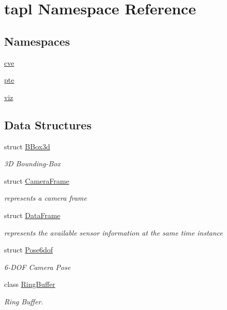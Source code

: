 \hypertarget{namespacetapl}{}\section{tapl Namespace Reference}
\label{namespacetapl}
\subsection*{Namespaces}
\begin{DoxyCompactItemize}
\item 
 \hyperlink{namespacetapl_1_1cve}{cve}
\item 
 \hyperlink{namespacetapl_1_1pte}{pte}
\item 
 \hyperlink{namespacetapl_1_1viz}{viz}
\end{DoxyCompactItemize}
\subsection*{Data Structures}
\begin{DoxyCompactItemize}
\item 
struct \hyperlink{structtapl_1_1BBox3d}{B\+Box3d}
\begin{DoxyCompactList}\small\item\em 3D Bounding-\/\+Box \end{DoxyCompactList}\item 
struct \hyperlink{structtapl_1_1CameraFrame}{Camera\+Frame}
\begin{DoxyCompactList}\small\item\em represents a camera frame \end{DoxyCompactList}\item 
struct \hyperlink{structtapl_1_1DataFrame}{Data\+Frame}
\begin{DoxyCompactList}\small\item\em represents the available sensor information at the same time instance \end{DoxyCompactList}\item 
struct \hyperlink{structtapl_1_1Pose6dof}{Pose6dof}
\begin{DoxyCompactList}\small\item\em 6-\/\+D\+OF Camera Pose \end{DoxyCompactList}\item 
class \hyperlink{classtapl_1_1RingBuffer}{Ring\+Buffer}
\begin{DoxyCompactList}\small\item\em Ring Buffer. \end{DoxyCompactList}\end{DoxyCompactItemize}
